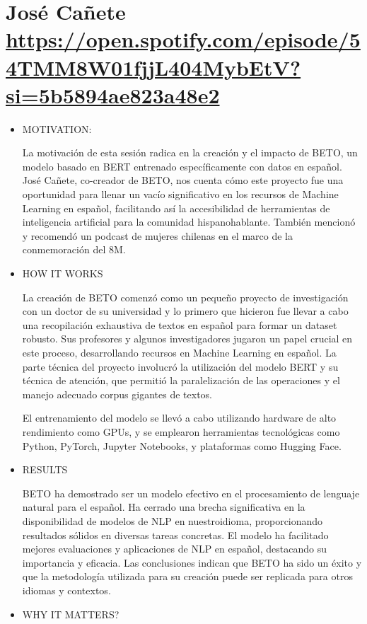 \documentclass[letter, 11pt, twoside]{report}
\begin{document}
\section*{José Cañete \color{mirosa}\url{https://open.spotify.com/episode/54TMM8W01fjjL404MybEtV?si=5b5894ae823a48e2}}
\begin{itemize}
    \item MOTIVATION:
    

    La motivación de esta sesión radica en la creación y el impacto de BETO, un modelo basado en BERT entrenado específicamente con datos en español. José Cañete, co-creador de BETO, nos cuenta cómo este proyecto fue una oportunidad para llenar un vacío significativo en los recursos de Machine Learning en español, facilitando así la accesibilidad de herramientas de inteligencia artificial para la comunidad hispanohablante. También mencionó y recomendó un podcast de mujeres chilenas en el marco de la conmemoración del 8M.
    \item HOW IT WORKS
    

    La creación de BETO comenzó como un pequeño proyecto de investigación con un doctor de su universidad y lo primero que hicieron fue llevar a cabo una recopilación exhaustiva de textos en español para formar un dataset robusto. 
    Sus profesores y algunos investigadores jugaron un papel crucial en este proceso, desarrollando recursos en Machine Learning en español. La parte técnica del proyecto involucró la utilización del modelo BERT y su técnica de atención, que permitió la paralelización de las operaciones y el manejo adecuado corpus gigantes de textos. 
    
    El entrenamiento del modelo se llevó a cabo utilizando hardware de alto rendimiento como GPUs, y se emplearon herramientas tecnológicas como Python, PyTorch, Jupyter Notebooks, y plataformas como Hugging Face.
    \item RESULTS
    

    BETO ha demostrado ser un modelo efectivo en el procesamiento de lenguaje natural para el español. Ha cerrado una brecha significativa en la disponibilidad de modelos de NLP en nuestroidioma, proporcionando resultados sólidos en diversas tareas concretas. El modelo ha facilitado mejores evaluaciones y aplicaciones de NLP en español, destacando su importancia y eficacia. Las conclusiones indican que BETO ha sido un éxito y que la metodología utilizada para su creación puede ser replicada para otros idiomas y contextos.
    \item WHY IT MATTERS?
    


\end{itemize}
\end{document}
